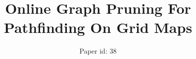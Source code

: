 \documentclass{article}
\begin{document}
\title{Online Graph Pruning For Pathfinding On Grid Maps}
\author{
Paper id: 38
}

\maketitle

\begin{abstract}

\end{abstract}







%



\end{document}
